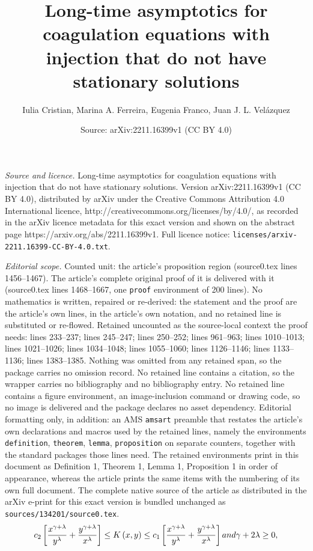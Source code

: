 \documentclass[10pt,a4paper]{amsart}
\title{Long-time asymptotics for coagulation equations with injection that do not have stationary solutions}
\author{Iulia Cristian, Marina A. Ferreira, Eugenia Franco, Juan J. L. Vel\'{a}zquez}
\date{Source: arXiv:2211.16399v1 (CC BY 4.0)}
\begin{document}
\maketitle

\noindent\emph{Source and licence.} Long-time asymptotics for coagulation equations with injection that do not have stationary solutions. Version arXiv:2211.16399v1 (CC BY 4.0), distributed by arXiv under the Creative Commons Attribution 4.0 International licence, http://creativecommons.org/licenses/by/4.0/, as recorded in the arXiv licence metadata for this exact version and shown on the abstract page https://arxiv.org/abs/2211.16399v1. Full licence notice: \texttt{licenses/arxiv-2211.16399-CC-BY-4.0.txt}.\par\smallskip

\noindent\textit{Editorial scope.} Counted unit: the article's proposition region (source0.tex lines 1456--1467). The article's complete original proof of it is delivered with it (source0.tex lines 1468--1667, one \texttt{proof} environment of 200 lines). No mathematics is written, repaired or re-derived: the statement and the proof are the article's own lines, in the article's own notation, and no retained line is substituted or re-flowed.  Retained uncounted as the source-local context the proof needs: lines 233--237; lines 245--247; lines 250--252; lines 961--963; lines 1010--1013; lines 1021--1026; lines 1034--1048; lines 1055--1060; lines 1126--1146; lines 1133--1136; lines 1383--1385.  Nothing was omitted from any retained span, so the package carries no omission record.  No retained line contains a citation, so the wrapper carries no bibliography and no bibliography entry.  No retained line contains a figure environment, an image-inclusion command or drawing code, so no image is delivered and the package declares no asset dependency.  Editorial formatting only, in addition: an AMS \texttt{amsart} preamble that restates the article's own declarations and macros used by the retained lines, namely the environments \texttt{definition}, \texttt{theorem}, \texttt{lemma}, \texttt{proposition} on separate counters, together with the standard packages those lines need.  The retained environments print in this document as Definition 1, Theorem 1, Lemma 1, Proposition 1 in order of appearance, whereas the article prints the same items with the numbering of its own full document.  The complete native source of the article as distributed in the arXiv e-print for this exact version is bundled unchanged as \texttt{sources/134201/source0.tex}.
\begin{equation} \label{kernel bounds} 
c_2 \left[  \frac{x^{\gamma+\lambda}}{y^{\lambda}}+\frac
{y^{\gamma+\lambda}}{x^{\lambda}} \right]  \leq K\left(  x,y\right)   \leq c_1 \left[  \frac{x^{\gamma+\lambda}}{y^{\lambda}}+\frac
{y^{\gamma+\lambda}}{x^{\lambda}} \right] \textup{ and } \gamma+2\lambda\geq 0,
\end{equation}
\end{document}
